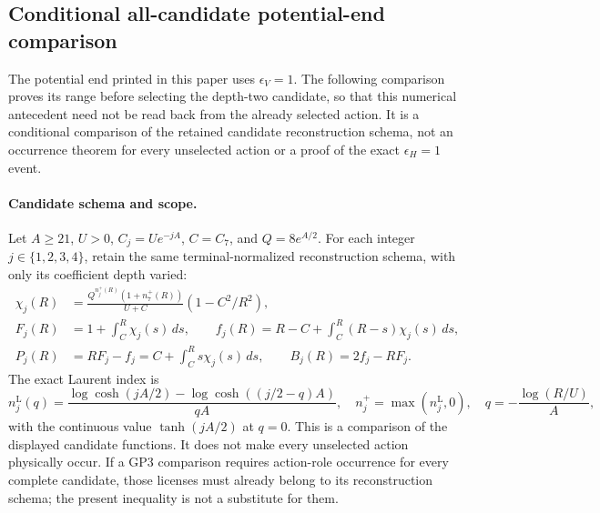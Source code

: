 \documentclass[12pt,a4paper]{article}
\begin{document}
\subsection{Conditional all-candidate potential-end comparison}
\label{p8:sec:v2216-all-candidate-inflation-end}
The potential end printed in this paper uses $\epsilon_V=1$.
The following comparison proves its range before selecting the depth-two
candidate, so that this numerical antecedent need not be read back from
the already selected action.  It is a conditional comparison of the
retained candidate reconstruction schema, not an occurrence theorem for
every unselected action or a proof of the exact $\epsilon_H=1$ event.

\paragraph{Candidate schema and scope.}
Let \(A\ge21\), \(U>0\), \(C_j=Ue^{-jA}\), \(C=C_7\), and
\(Q=8e^{A/2}\).  For each integer \(j\in\{1,2,3,4\}\), retain the
same terminal-normalized reconstruction schema, with only its coefficient
depth varied:
\begin{align}
 \chi_j(R)&=\frac{Q^{n_j^+(R)}(1+n_7^+(R))}{U+C}
                               (1-C^2/R^2),\nonumber\\
 F_j(R)&=1+\int_C^R\chi_j(s)\,ds,\qquad
 f_j(R)=R-C+\int_C^R(R-s)\chi_j(s)\,ds,\label{p8:eq:v2216-candidate-family}\\
 P_j(R)&=RF_j-f_j=C+\int_C^R s\chi_j(s)\,ds,\qquad
 B_j(R)=2f_j-RF_j.\nonumber
\end{align}
The exact Laurent index is
\[
 n_j^{\mathrm L}(q)=
 \frac{\log\cosh(jA/2)-\log\cosh((j/2-q)A)}{qA},
 \quad n_j^+=\max(n_j^{\mathrm L},0),\quad
 q=-\frac{\log(R/U)}A,
\]
with the continuous value \(\tanh(jA/2)\) at \(q=0\).
This is a comparison of the displayed candidate functions.  It does not
make every unselected action physically occur.  If a GP3 comparison
requires action-role occurrence for every complete candidate, those
licenses must already belong to its reconstruction schema; the present
inequality is not a substitute for them.
\end{document}
